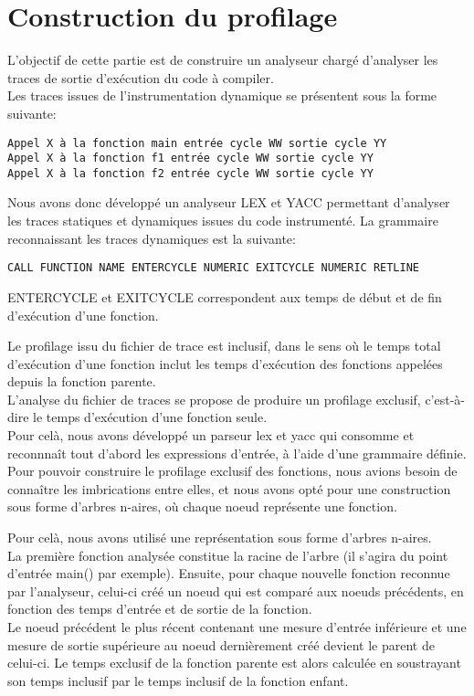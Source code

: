 \section{Construction du profilage}

L'objectif de cette partie est de construire un analyseur chargé d'analyser les traces de sortie d'exécution du code à compiler.\\

Les traces issues de l'instrumentation dynamique se présentent sous la forme suivante:
\begin{verbatim}
Appel X à la fonction main entrée cycle WW sortie cycle YY
Appel X à la fonction f1 entrée cycle WW sortie cycle YY
Appel X à la fonction f2 entrée cycle WW sortie cycle YY
\end{verbatim}

Nous avons donc développé un analyseur LEX et YACC permettant d'analyser les traces statiques et dynamiques issues du code instrumenté.
La grammaire reconnaissant les traces dynamiques est la suivante:
\begin{verbatim}
CALL FUNCTION NAME ENTERCYCLE NUMERIC EXITCYCLE NUMERIC RETLINE
\end{verbatim}

ENTERCYCLE et EXITCYCLE correspondent aux temps de début et de fin d'exécution d'une fonction.

Le profilage issu du fichier de trace est inclusif, dans le sens où le temps total d'exécution d'une fonction inclut les temps d'exécution des fonctions appelées depuis la fonction parente.\\
L'analyse du fichier de traces se propose de produire un profilage exclusif, c'est-à-dire le temps d'exécution d'une fonction seule.\\
Pour celà, nous avons développé un parseur lex et yacc qui consomme et reconnnaît tout d'abord les expressions d'entrée, à l'aide d'une grammaire définie.\\

Pour pouvoir construire le profilage exclusif des fonctions, nous avions besoin de connaître les imbrications entre elles, et nous avons opté pour une construction sous forme d'arbres n-aires, où chaque noeud représente une fonction.

Pour celà, nous avons utilisé une représentation sous forme d'arbres n-aires.\\
La première fonction analysée constitue la racine de l'arbre (il s'agira du point d'entrée main() par exemple). Ensuite, pour chaque nouvelle fonction reconnue par l'analyseur, celui-ci créé un noeud qui est comparé aux noeuds précédents, en fonction des temps d'entrée et de sortie de la fonction.\\
Le noeud précédent le plus récent contenant une mesure d'entrée inférieure et une mesure de sortie supérieure au noeud dernièrement créé devient le parent de celui-ci. Le temps exclusif de la fonction parente est alors calculée en soustrayant son temps inclusif par le temps inclusif de la fonction enfant.\\

